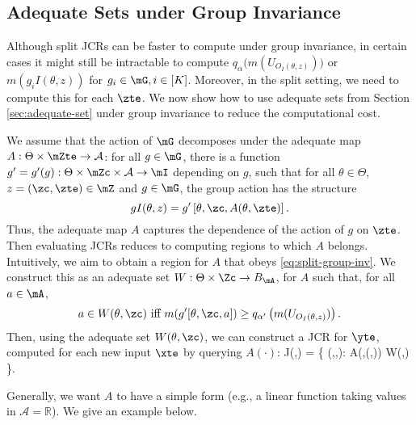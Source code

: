 \documentclass[english]{article}
\begin{document}
\subsection{Adequate Sets under Group Invariance}\label{sec:adequate-set-invariance}

Although split JCRs can be faster to compute under group invariance, 
in certain cases it might still be intractable to compute $q_{\alpha}\big(m(U_{O_I(\theta,z)})\big)$ or $m(g_iI(\theta,z))$ for $g_i \in \mG, i\in[K]$. 
Moreover, in the split setting, 
we need to compute this for each $\zte$.
We now show how to use
adequate sets
from Section \ref{sec:adequate-set} under group invariance to reduce the computational cost.

We assume that the action of $\mG$ decomposes under the adequate map
$A: \Theta \times \mZte \to \mathcal{A}$:
 for all $g\in\mG$, there is a function $g' = g'(g): \Theta \times \mZc \times \mathcal{A} \to \mI$
depending on $g$, 
such that 
for all $\theta\in\Theta$, $z = (\zc,\zte) \in \mZ$ and $g\in\mG$, the group
action has the structure
$$gI(\theta,z) = g'\left[\theta, \zc, A(\theta,\zte)\right].$$ 
Thus, the adequate map $A$ 
captures the dependence of the action of $g$ 
on $\zte$.
Then evaluating JCRs reduces to computing regions to which $A$ belongs. Intuitively, we aim to obtain a region for $A$ that obeys \eqref{eq:split-group-inv}. We construct this as an adequate set $W:\Theta\times \Zc \to B_{\mA}$, for $A$ such that,
for all $a\in \mA$,
\begin{align}\label{ade-inv}
a \in W(\theta,\zc)
\textnormal{ iff } 
m(g'[\theta,\zc,a]) \ge q_{\alpha'}\left(m(U_{O_I(\theta,z)})\right).
\end{align}
Then, using the adequate set $W(\theta,\zc)$, we can construct a JCR for $\yte$, 
computed for each new input $\xte$ by querying $A(\cdot)$:
\beq\label{ade}
J(\zc,\xte) = \left\{ (\theta,\xte,\yte): A(\theta,(\xte,\yte)) \in W(\theta,\zc) \right\}.
\eeq

Generally, we want $A$ to have a simple form
(e.g., a linear function taking values in $\mathcal{A} = \mathbb{R}$). 
We give an example below.
\end{document}
